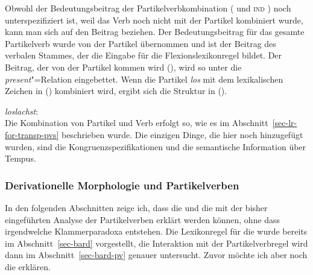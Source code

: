 \noindent
Obwohl der Bedeutungsbeitrag der Partikelverbkombination (\ltop {} und \textsc{ind} ) noch unterspezifiziert
ist, weil das Verb noch nicht mit der Partikel kombiniert wurde, kann man sich
auf den Beitrag beziehen. Der Bedeutungsbeitrag für das gesamte Partikelverb wurde von der Partikel
übernommen und ist der Beitrag des verbalen Stammes, der die Eingabe für die Flexionslexikonregel
bildet. Der Beitrag, der von der Partikel kommen wird (\ltop {}), wird so unter
die \emph{present}"=Relation eingebettet. Wenn die Partikel \emph{los}
mit dem lexikalischen Zeichen in () kombiniert wird, ergibt sich die Struktur in ().

\eas
\emph{loslachst}:\\
\zs
Die Kombination von Partikel und Verb erfolgt so, wie es im Abschnitt~\ref{sec-lr-for-transp-pvs}
beschrieben wurde. Die einzigen Dinge, die hier noch hinzugefügt wurden, sind die
Kongruenzspezifikationen und die semantische Information über Tempus.



\subsubsection{Derivationelle Morphologie und Partikelverben}
\label{sec-derivation-hpsg}

In den folgenden Abschnitten zeige ich, dass die \geen und die \bard
mit der bisher eingeführten Analyse der Partikelverben erklärt werden können,
ohne dass irgendwelche Klammerparadoxa entstehen. Die Lexikonregel für die
\bard wurde bereits im Abschnitt~\ref{sec-bard} vorgestellt, die Interaktion mit der
Partikelverbregel wird dann im Abschnitt~\ref{sec-bard-pv} genauer untersucht.
Zuvor möchte ich aber noch die \geen erklären.

